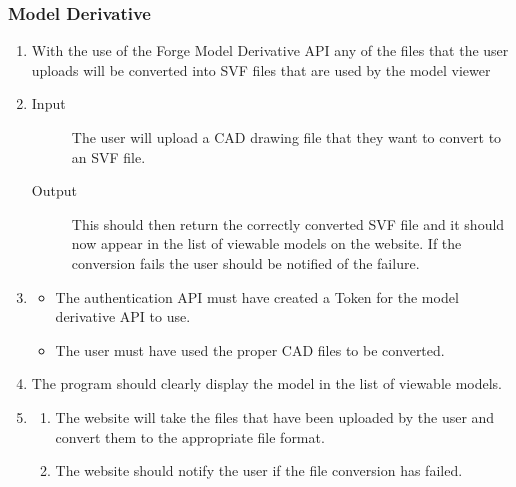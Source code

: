 \documentclass[letterpaper, 10pt, draftclsnofoot, compsoc, onecolumn]{IEEEtran}
\begin{document}
\subsubsection{Model Derivative}

\begin{enumerate}
	\item With the use of the Forge Model Derivative API any of the files that the user uploads will be converted into SVF files
	that are used by the model viewer
	
	\item
	\begin{description}
		\item[Input] The user will upload a CAD drawing file that they want to convert to an SVF file. 
		\item[Output] This should then return the correctly converted SVF file and it should now appear in the list of 
		viewable models on the website. If the conversion fails the user should be notified of the failure.
	\end{description}

	\item
	\begin{itemize}
		\item The authentication API must have created a Token for the model derivative API to use.
		\item The user must have used the proper CAD files to be converted. 
	\end{itemize}

	\item The program should clearly display the model in the list of viewable models.

	\item
	\begin{enumerate}
		\item The website will take the files that have been uploaded by the user and convert them to the appropriate file
		format.
		\item The website should notify the user if the file conversion has failed.
	\end{enumerate}   
\end{enumerate}
\end{document}
